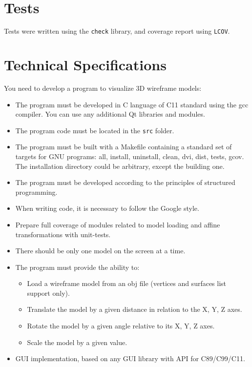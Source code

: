 \documentclass{article}
\begin{document}
\section{Tests}
\label{tests}

Tests were written using the \texttt{check} library, and coverage report using \texttt{LCOV}.

\section{Technical Specifications}
\label{technical-specifications}

You need to develop a program to visualize 3D wireframe models:

\begin{itemize}
  \item The program must be developed in C language of C11 standard using the gcc compiler. You can use any additional Qt libraries and modules.
  \item The program code must be located in the \texttt{src} folder.
  \item The program must be built with a Makefile containing a standard set of targets for GNU programs: all, install, uninstall, clean, dvi, dist, tests, gcov. The installation directory could be arbitrary, except the building one.
  \item The program must be developed according to the principles of structured programming.
  \item When writing code, it is necessary to follow the Google style.
  \item Prepare full coverage of modules related to model loading and affine transformations with unit-tests.
  \item There should be only one model on the screen at a time.
  \item The program must provide the ability to:
        \begin{itemize}
          \item Load a wireframe model from an obj file (vertices and surfaces list support only).
          \item Translate the model by a given distance in relation to the X, Y, Z axes.
          \item Rotate the model by a given angle relative to its X, Y, Z axes.
          \item Scale the model by a given value.
        \end{itemize}
  \item GUI implementation, based on any GUI library with API for C89/C99/C11.

\end{itemize}
\end{document}
